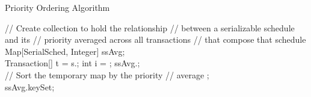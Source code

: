 \documentclass[conference]{IEEEtran}
\begin{document}
\begin{algorithm}
\caption{Priority Ordering Algorithm}
\label{alg:priority_algorithm}
\begin{algorithmic}[1]

    \State // Create collection to hold the relationship
    \State // between a serializable schedule and its
    \State // priority averaged across all transactions
    \State // that compose that schedule
    \State Map[SerialSched, Integer] ssAvg; \label{l:mapstart}
    \\
    \label{l:forstart}
      \State Transaction[] t = s.; \label{l:gettrans}
      \State int i = ; \label{l:avgt}
      \State ssAvg.; \label{l:mapadd}
    \EndFor
    \\
    \State // Sort the temporary map by the priority
    \State // average
    \State {};
    \\
    \State \Return ssAvg.keySet; \label{l:returnkeys}
    \\
  \EndFunction

\end{algorithmic}
\end{algorithm}
\end{document}
